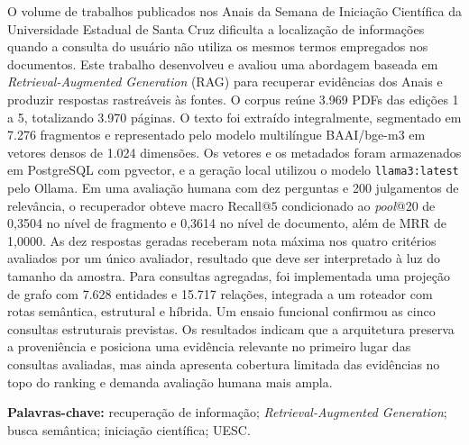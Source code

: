 \documentclass[a4paper,12pt,oneside,openany]{monografia_sic_uesc}
\let\setstretch\undefined
\begin{document}
\setstretch{1.5}


\bacharelado
{}



\capaefolhas

\begin{singlespace}
O volume de trabalhos publicados nos Anais da Semana de Iniciação Científica da Universidade Estadual de Santa Cruz dificulta a localização de informações quando a consulta do usuário não utiliza os mesmos termos empregados nos documentos. Este trabalho desenvolveu e avaliou uma abordagem baseada em \textit{Retrieval-Augmented Generation} (RAG) para recuperar evidências dos Anais e produzir respostas rastreáveis às fontes. O corpus reúne 3.969 PDFs das edições 1 a 5, totalizando 3.970 páginas. O texto foi extraído integralmente, segmentado em 7.276 fragmentos e representado pelo modelo multilíngue BAAI/bge-m3 em vetores densos de 1.024 dimensões. Os vetores e os metadados foram armazenados em PostgreSQL com pgvector, e a geração local utilizou o modelo \texttt{llama3:latest} pelo Ollama. Em uma avaliação humana com dez perguntas e 200 julgamentos de relevância, o recuperador obteve macro Recall@$5$ condicionado ao \textit{pool}@20 de 0,3504 no nível de fragmento e 0,3614 no nível de documento, além de MRR de 1,0000. As dez respostas geradas receberam nota máxima nos quatro critérios avaliados por um único avaliador, resultado que deve ser interpretado à luz do tamanho da amostra. Para consultas agregadas, foi implementada uma projeção de grafo com 7.628 entidades e 15.717 relações, integrada a um roteador com rotas semântica, estrutural e híbrida. Um ensaio funcional confirmou as cinco consultas estruturais previstas. Os resultados indicam que a arquitetura preserva a proveniência e posiciona uma evidência relevante no primeiro lugar das consultas avaliadas, mas ainda apresenta cobertura limitada das evidências no topo do ranking e demanda avaliação humana mais ampla.

\noindent\textbf{Palavras-chave:} recuperação de informação; \textit{Retrieval-Augmented Generation}; busca semântica; iniciação científica; UESC.


\end{singlespace}
\end{document}

